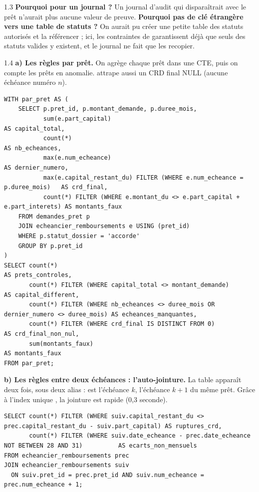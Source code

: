 \begin{correction}{1.3}
\textbf{Pourquoi  pour un journal ?} Un journal d'audit qui disparaîtrait avec le prêt
n'aurait plus aucune valeur de preuve. \textbf{Pourquoi pas de clé étrangère vers une table de
statuts ?} On aurait pu créer une petite table des statuts autorisés et la référencer ; ici, les
contraintes  de  garantissent déjà que seuls des statuts valides y
existent, et le journal ne fait que les recopier.
\end{correction}

\begin{correction}{1.4}
\textbf{a) Les règles par prêt.} On agrège chaque prêt dans une CTE, puis on compte les prêts en
anomalie.  attrape aussi un CRD final NULL (aucune échéance numéro $n$).
\begin{lstlisting}[style=long]
WITH par_pret AS (
    SELECT p.pret_id, p.montant_demande, p.duree_mois,
           sum(e.part_capital)                                                      AS capital_total,
           count(*)                                                                 AS nb_echeances,
           max(e.num_echeance)                                                      AS dernier_numero,
           max(e.capital_restant_du) FILTER (WHERE e.num_echeance = p.duree_mois)   AS crd_final,
           count(*) FILTER (WHERE e.montant_du <> e.part_capital + e.part_interets) AS montants_faux
    FROM demandes_pret p
    JOIN echeancier_remboursements e USING (pret_id)
    WHERE p.statut_dossier = 'accorde'
    GROUP BY p.pret_id
)
SELECT count(*)                                                                         AS prets_controles,
       count(*) FILTER (WHERE capital_total <> montant_demande)                           AS capital_different,
       count(*) FILTER (WHERE nb_echeances <> duree_mois OR dernier_numero <> duree_mois) AS echeances_manquantes,
       count(*) FILTER (WHERE crd_final IS DISTINCT FROM 0)                               AS crd_final_non_nul,
       sum(montants_faux)                                                                 AS montants_faux
FROM par_pret;
\end{lstlisting}

\textbf{b) Les règles entre deux échéances : l'auto-jointure.} La table apparaît deux fois, sous deux
alias :  est l'échéance $k$,  l'échéance $k+1$ du même prêt. Grâce à l'index
unique , la jointure est rapide (0,3 seconde).
\begin{lstlisting}[style=long]
SELECT count(*) FILTER (WHERE suiv.capital_restant_du <> prec.capital_restant_du - suiv.part_capital) AS ruptures_crd,
       count(*) FILTER (WHERE suiv.date_echeance - prec.date_echeance NOT BETWEEN 28 AND 31)          AS ecarts_non_mensuels
FROM echeancier_remboursements prec
JOIN echeancier_remboursements suiv
  ON suiv.pret_id = prec.pret_id AND suiv.num_echeance = prec.num_echeance + 1;
\end{lstlisting}


\end{correction}
